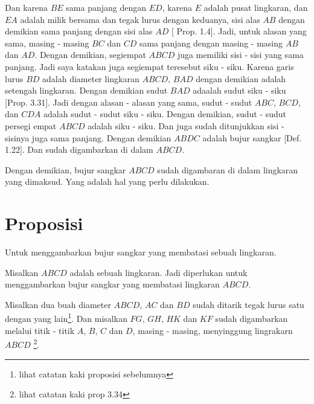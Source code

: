 \documentclass[a4paper]{book}
\begin{document}
Dan karena $BE$ sama panjang dengan $ED$, karena $E$ adalah pusat 
lingkaran, dan $EA$ adalah milik bersama dan tegak lurus dengan keduanya, 
sisi alas $AB$ dengan demikian sama panjang dengan sisi alas $AD$ [
Prop. 1.4]. Jadi, untuk alasan yang sama, masing - masing $BC$ dan $CD$ 
sama panjang dengan masing - masing $AB$ dan $AD$. Dengan demikian, 
segiempat $ABCD$ juga memiliki sisi - sisi yang sama panjang. Jadi saya
katakan juga segiempat teresebut siku - siku. Karena garis lurus
$BD$ adalah diameter lingkaran $ABCD$, $BAD$ dengan demikian adalah 
setengah lingkaran. Dengan demikian sudut $BAD$ adaalah sudut siku - siku
[Prop. 3.31]. Jadi dengan alasan - alasan yang sama, sudut - sudut $ABC$,
$BCD$, dan $CDA$ adalah sudut - sudut siku - siku. Dengan demikian, 
sudut - sudut persegi empat $ABCD$ adalah siku - siku. Dan juga sudah 
ditunjukkan sisi - sisinya juga sama panjang. Dengan demikian $ABDC$ adalah
bujur sangkar [Def. 1.22]. Dan sudah digambarkan di dalam $ABCD$.

Dengan demikian, bujur sangkar $ABCD$ sudah digambaran di dalam lingkaran
yang dimaksud. Yang adalah hal yang perlu dilakukan.

\section*{\centering Proposisi \thesection}
Untuk menggambarkan bujur sangkar yang membatasi sebuah lingkaran.
\begin{center} 
\end{center} 
Misalkan $ABCD$ adalah sebuah lingkaran. Jadi diperlukan untuk menggambarkan
bujur sangkar yang membatasi lingkaran $ABCD$.

Misalkan dua buah diameter $ABCD$, $AC$ dan $BD$ sudah ditarik tegak lurus
satu dengan yang lain\footnote{lihat catatan kaki proposisi sebelumnya}. Dan 
misalkan $FG$, $GH$, $HK$ dan $KF$ sudah digambarkan melalui titik - titik
$A$, $B$, $C$ dan $D$, masing - masing, menyinggung lingrakarn $ABCD$ \footnote{lihat catatan kaki prop 3.34}.
\end{document}
